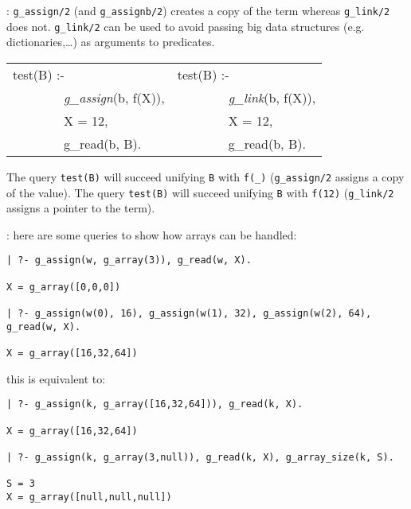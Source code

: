 :
\texttt{g\_assign/2} (and \texttt{g\_assignb/2}) creates a copy of the term
whereas \texttt{g\_link/2} does not. \texttt{g\_link/2} can be used to avoid
passing big data structures (e.g. dictionaries,\ldots) as arguments to
predicates.

\begin{Code}
\begin{tabular}{@{}p{6cm}@{\quad}l@{}}
test(B) :-                           & test(B) :-                \\
~~~~~~~~\textit{g\_assign}(b, f(X)), & ~~~~~~~~\textit{g\_link}(b, f(X)), \\
~~~~~~~~X = 12,                      & ~~~~~~~~X = 12,           \\
~~~~~~~~g\_read(b, B).               & ~~~~~~~~g\_read(b, B).    \\
\end{tabular}
\end{Code}

The query \texttt{test(B)} will succeed unifying \texttt{B} with
\texttt{f(\_)} (\texttt{g\_assign/2} assigns a copy of the value). The query
\texttt{test(B)} will succeed unifying \texttt{B} with \texttt{f(12)}
(\texttt{g\_link/2} assigns a pointer to the term).

: here are some queries to show how arrays
can be handled:

\begin{Indentation}
\begin{verbatim}
| ?- g_assign(w, g_array(3)), g_read(w, X).

X = g_array([0,0,0])

| ?- g_assign(w(0), 16), g_assign(w(1), 32), g_assign(w(2), 64), g_read(w, X).

X = g_array([16,32,64])
\end{verbatim}
\end{Indentation}

this is equivalent to:

\begin{Indentation}
\begin{verbatim}
| ?- g_assign(k, g_array([16,32,64])), g_read(k, X).

X = g_array([16,32,64])

| ?- g_assign(k, g_array(3,null)), g_read(k, X), g_array_size(k, S).

S = 3
X = g_array([null,null,null])
\end{verbatim}
\end{Indentation}

